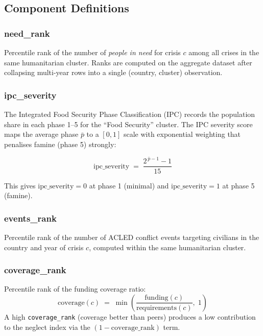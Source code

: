 \documentclass[11pt,a4paper]{article}
\newcommand{\code}[1]{\texttt{#1}}
\begin{document}
\subsection{Component Definitions}

\subsubsection{need\_rank}

Percentile rank of the number of \emph{people in need} for crisis $c$ among all
crises in the same humanitarian cluster.
Ranks are computed on the aggregate dataset after collapsing multi-year rows into a
single (country, cluster) observation.

\subsubsection{ipc\_severity}

The Integrated Food Security Phase Classification (IPC) records the population share
in each phase 1--5 for the ``Food Security'' cluster.
The IPC severity score maps the average phase $\bar{p}$ to a $[0, 1]$ scale with
exponential weighting that penalises famine (phase 5) strongly:

\begin{equation}\label{eq:ipc}
  \text{ipc\_severity} \;=\; \frac{2^{\,\bar{p} - 1} - 1}{15}
\end{equation}

\noindent This gives $\text{ipc\_severity} = 0$ at phase 1 (minimal) and
$\text{ipc\_severity} = 1$ at phase 5 (famine).

\subsubsection{events\_rank}

Percentile rank of the number of ACLED conflict events targeting civilians in the
country and year of crisis $c$, computed within the same humanitarian cluster.

\subsubsection{coverage\_rank}

Percentile rank of the funding coverage ratio:
\[
  \text{coverage}(c) \;=\; \min\!\left(\frac{\text{funding}(c)}{\text{requirements}(c)},\; 1\right)
\]
A high \code{coverage\_rank} (coverage better than peers) produces a low
contribution to the neglect index via the $(1 - \text{coverage\_rank})$ term.
\end{document}

